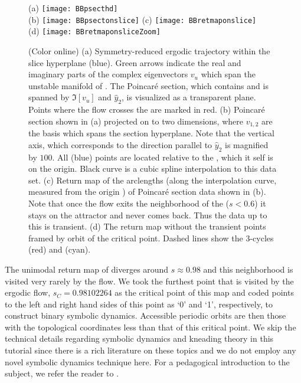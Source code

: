 \begin{figure}
\centering
  (a) \texttt{[image: BBpsecthd]} \\
  (b) \texttt{[image: BBpsectonslice]}
  (c) \texttt{[image: BBretmaponslice]} \\
  (d) \texttt{[image: BBretmaponsliceZoom]}
\caption{(Color online)
         (a) Symmetry-reduced ergodic trajectory within the slice hyperplane 
             (blue). Green arrows indicate the real and imaginary parts of the 
             complex eigenvectors $v_u$ which span the unstable manifold of 
             \REQV{}{}. The Poincar\'e section, which contains \REQV{}{} and 
             is spanned by $\Im[v_u]$ and $\hat{y}_2$, is visualized as a 
             transparent plane. Points where the flow crosses the are marked 
             in red.
		 (b) Poincar\'e section shown in (a) projected on to two dimensions, 
		 	 where $v_{1,2}$ are the basis which spans the section hyperplane.
		 	 Note that the vertical axis, which corresponds to the direction 
		 	 parallel to $\hat{y}_2$ is magnified by $100$. All (blue) points 
		 	 are located relative to the \REQV{}{}, which it self is on the origin.
		 	 Black curve is a cubic spline interpolation to this data set.		  	
		 (c) Return map of the arclengths (along the interpolation curve, measured
		     from the origin \REQV{}{}) of Poincar\'e section data shown in (b). 
			 Note that once the flow exits the neighborhood of the \REQV{}{} 
			 ($s < 0.6$) it stays on the attractor and never comes back. Thus the data 
			 up to this is transient.
		 (d) The return map without the transient points framed by orbit of the 
		     critical point. Dashed lines show the 3-cycles  (red) and 
		      (cyan).}
\label{fig:psectandretmap}
\end{figure}

The unimodal return map of  diverges around
$s \approx 0.98$ and this neighborhood is visited very rarely by the flow. We
took the furthest point that is visited by the ergodic flow, $s_C=0.98102264$
as the critical point of this map and coded points to the left and right hand sides of this
point as `0' and `1', respectively, to construct binary symbolic dynamics.
Accessible periodic orbits are then those with the topological coordinates
less than that of this critical point. We skip the technical details
regarding symbolic dynamics and kneading theory in this tutorial since
there is a rich literature on these topics and we do not employ any novel
symbolic dynamics technique here. For a pedagogical introduction to the
subject, we refer the reader to .

